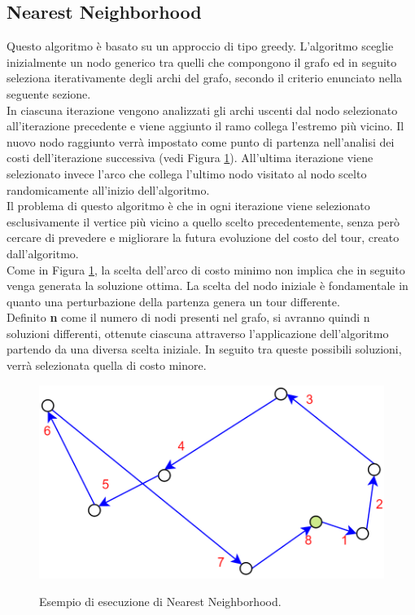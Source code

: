 \subsection{Nearest Neighborhood}
Questo algoritmo è basato su un approccio di tipo greedy. L'algoritmo sceglie inizialmente un nodo generico tra quelli che compongono il grafo ed in seguito seleziona iterativamente degli archi del grafo, secondo il criterio enunciato nella seguente sezione.\\
In ciascuna iterazione vengono analizzati gli archi uscenti dal nodo selezionato all'iterazione precedente e viene aggiunto il ramo collega l'estremo più vicino. Il nuovo nodo raggiunto verrà impostato come punto di partenza nell'analisi dei costi dell'iterazione successiva (vedi Figura \ref{nearest_neighborhood}).
All'ultima iterazione viene selezionato invece l'arco che collega l'ultimo nodo visitato al nodo scelto randomicamente all'inizio dell'algoritmo.\\
Il problema di questo algoritmo è che in ogni iterazione viene selezionato esclusivamente il vertice più vicino a quello scelto precedentemente, senza però cercare di prevedere e migliorare la futura evoluzione del costo del tour, creato dall'algoritmo.\\
Come in Figura \ref{nearest_neighborhood}, la scelta dell'arco di costo minimo non implica che in seguito venga generata la soluzione ottima. La scelta del nodo iniziale è fondamentale in quanto una perturbazione della partenza genera un tour differente.\\
Definito \textbf{n} come il numero di nodi presenti nel grafo, si avranno quindi n soluzioni differenti, ottenute ciascuna attraverso l'applicazione dell'algoritmo partendo da una diversa scelta iniziale. In seguito tra queste possibili soluzioni, verrà selezionata quella di costo minore.\\
\begin{figure}[H] 
\begin{center} 
  \includegraphics[scale=0.3]{Images/nearest_neighborhood}\\ 
  \caption{\footnotesize{Esempio di esecuzione di Nearest Neighborhood.}}
  \label{nearest_neighborhood} 
\end{center} 
\end{figure}

